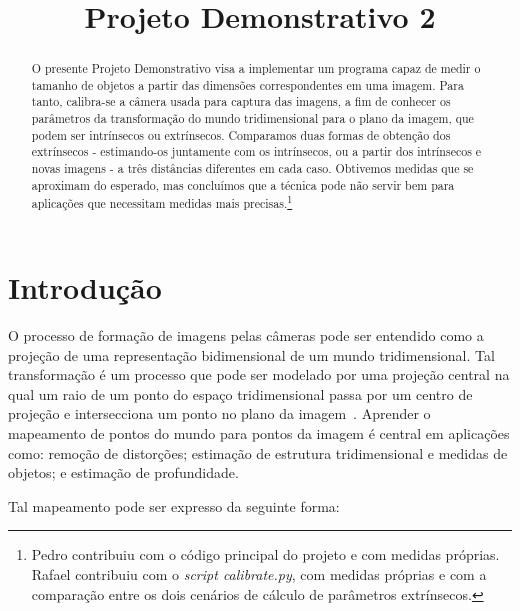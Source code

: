 \documentclass{bmvc2k}
\title{Projeto Demonstrativo 2}
\begin{document}
\begin{NoHyper}
\maketitle
\end{NoHyper}

\begin{abstract}
O presente Projeto Demonstrativo visa a implementar um programa capaz de medir o tamanho de objetos a partir das dimensões correspondentes em uma imagem. Para tanto, calibra-se a câmera usada para captura das imagens, a fim de conhecer os parâmetros da transformação do mundo tridimensional para o plano da imagem, que podem ser intrínsecos ou extrínsecos. Comparamos duas formas de obtenção dos extrínsecos - estimando-os juntamente com os intrínsecos, ou a partir dos intrínsecos e novas imagens - a três distâncias diferentes em cada caso. Obtivemos medidas que se aproximam do esperado, mas concluímos que a técnica pode não servir bem para aplicações que necessitam medidas mais precisas.\footnote{Pedro contribuiu com o código principal do projeto e com medidas próprias. Rafael contribuiu com o \textit{script calibrate.py}, com medidas próprias e com a comparação entre os dois cenários de cálculo de parâmetros extrínsecos.}
\end{abstract}

\section{Introdução}
\label{sec:intro}

O processo de formação de imagens pelas câmeras pode ser entendido como a projeção de uma representação bidimensional
de um mundo tridimensional. Tal transformação é um processo que pode ser modelado por uma projeção central na qual um raio de um ponto do espaço tridimensional passa por um centro de projeção e intersecciona um ponto no plano da imagem~\cite{Hartley:2003:MVG:861369}. Aprender o mapeamento de pontos do mundo para pontos da imagem é central em aplicações como: remoção de distorções; estimação de estrutura tridimensional e medidas de objetos; e estimação de profundidade.

Tal mapeamento pode ser expresso da seguinte forma:
\end{document}

